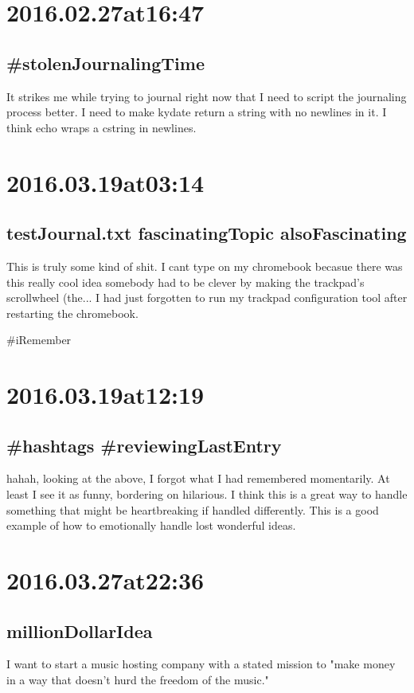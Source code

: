 \begin{enumerate}
\section*{  2016.02.27at16:47 }
\subsection*{  \#stolenJournalingTime }
It strikes me while trying to journal right now that I need to script the journaling process better. I need to make kydate return a string with no newlines in it. I think echo wraps a cstring in newlines.
 

\section*{ 2016.03.19at03:14 }
\subsection*{ testJournal.txt fascinatingTopic alsoFascinating }
This is truly some kind of shit. I cant type on my chromebook becasue there was this really cool idea somebody had to be clever by making the trackpad's scrollwheel (the... I had just forgotten to run my trackpad configuration tool after restarting the chromebook.

\#iRemember

\section*{ 2016.03.19at12:19 }
\subsection*{ \#hashtags \#reviewingLastEntry }
hahah, looking at the above, I forgot what I had remembered momentarily. At least I see it as funny, bordering on hilarious. I think this is a great way to handle something that might be heartbreaking if handled differently. This is a good example of how to emotionally handle lost wonderful ideas. 

\section*{ 2016.03.27at22:36 }
\subsection*{ millionDollarIdea }
I want to start a music hosting company with a stated mission to "make money in a way that doesn't hurd the freedom of the music."


\end{enumerate}
